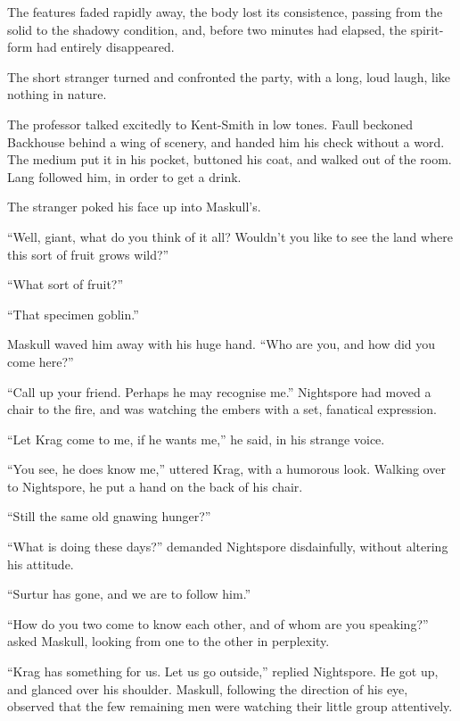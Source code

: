The features faded rapidly away, the body lost its consistence, passing from the solid to the shadowy condition, and, before two minutes had elapsed, the spirit-form had entirely disappeared.

The short stranger turned and confronted the party, with a long, loud laugh, like nothing in nature.

The professor talked excitedly to Kent-Smith in low tones. Faull beckoned Backhouse behind a wing of scenery, and handed him his check without a word. The medium put it in his pocket, buttoned his coat, and walked out of the room. Lang followed him, in order to get a drink.

The stranger poked his face up into Maskull's.

``Well, giant, what do you think of it all? Wouldn't you like to see the land where this sort of fruit grows wild?''

``What sort of fruit?''

``That specimen goblin.''

Maskull waved him away with his huge hand. ``Who are you, and how did you come here?''

``Call up your friend. Perhaps he may recognise me.'' Nightspore had moved a chair to the fire, and was watching the embers with a set, fanatical expression.

``Let Krag come to me, if he wants me,'' he said, in his strange voice.

``You see, he does know me,'' uttered Krag, with a humorous look. Walking over to Nightspore, he put a hand on the back of his chair.

``Still the same old gnawing hunger?''

``What is doing these days?'' demanded Nightspore disdainfully, without altering his attitude.

``Surtur has gone, and we are to follow him.''

``How do you two come to know each other, and of whom are you speaking?'' asked Maskull, looking from one to the other in perplexity.

``Krag has something for us. Let us go outside,'' replied Nightspore. He got up, and glanced over his shoulder. Maskull, following the direction of his eye, observed that the few remaining men were watching their little group attentively.



\chapterend